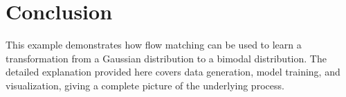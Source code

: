 \documentclass[12pt,a4paper]{article}
\begin{document}
\section{Conclusion}
This example demonstrates how flow matching can be used to learn a transformation from a Gaussian distribution to a bimodal distribution. The detailed explanation provided here covers data generation, model training, and visualization, giving a complete picture of the underlying process.
\end{document}
